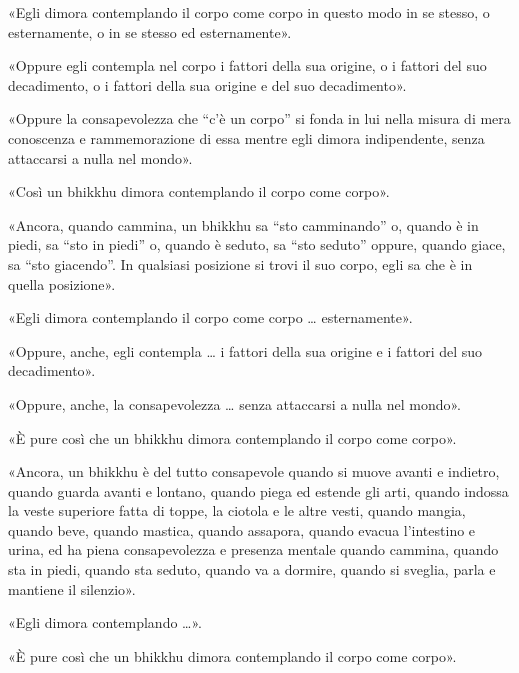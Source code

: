 «Egli dimora contemplando il corpo come corpo in questo modo in se stesso, o
esternamente, o in se stesso ed esternamente».

«Oppure egli contempla nel corpo i fattori della sua origine, o i fattori del
suo decadimento, o i fattori della sua origine e del suo decadimento».

«Oppure la consapevolezza che “c’è un corpo” si fonda in lui nella misura di
mera conoscenza e rammemorazione di essa mentre egli dimora indipendente, senza
attaccarsi a nulla nel mondo».

«Così un bhikkhu dimora contemplando il corpo come corpo».

«Ancora, quando cammina, un bhikkhu sa “sto camminando” o, quando è in piedi, sa
“sto in piedi” o, quando è seduto, sa “sto seduto” oppure, quando giace, sa “sto
giacendo”. In qualsiasi posizione si trovi il suo corpo, egli sa che è in quella
posizione».

«Egli dimora contemplando il corpo come corpo … esternamente».

«Oppure, anche, egli contempla … i fattori della sua origine e i fattori del suo
decadimento».

«Oppure, anche, la consapevolezza … senza attaccarsi a nulla nel mondo».

«È pure così che un bhikkhu dimora contemplando il corpo come corpo».

«Ancora, un bhikkhu è del tutto consapevole quando si muove avanti e indietro,
quando guarda avanti e lontano, quando piega ed estende gli arti, quando indossa
la veste superiore fatta di toppe, la ciotola e le altre vesti, quando mangia,
quando beve, quando mastica, quando assapora, quando evacua l’intestino e urina,
ed ha piena consapevolezza e presenza mentale quando cammina, quando sta in
piedi, quando sta seduto, quando va a dormire, quando si sveglia, parla e
mantiene il silenzio».

«Egli dimora contemplando …».

«È pure così che un bhikkhu dimora contemplando il corpo come corpo».

